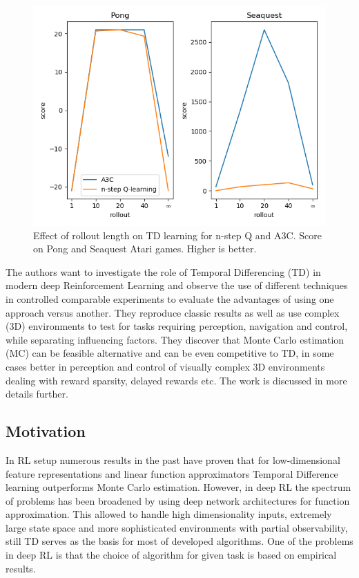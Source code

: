 \documentclass{article}
\begin{document}
\begin{figure}[H]
    \centering
    \includegraphics[scale=0.75]{results}
    \caption{Effect of rollout length on TD learning for n-step Q and A3C. Score on
    Pong and Seaquest Atari games. Higher is better.}
    \label{rollouts}
\end{figure}


\pagebreak

The authors want to investigate the role of Temporal Differencing (TD)
in modern deep Reinforcement Learning and observe the use of
different techniques in controlled comparable experiments to evaluate the
advantages of using one approach versus another.
They reproduce classic results as well as use
complex (3D) environments to test for tasks requiring perception,
navigation and control, while separating influencing factors.
They discover that Monte Carlo estimation
(MC) can be feasible alternative and can be even competitive to TD,
in some cases better
in perception and control of visually complex 3D environments
dealing with reward sparsity, delayed rewards etc.
The work is discussed in more details further.

\subsection{Motivation}
In RL setup numerous results in the past have proven
that for low-dimensional feature representations and linear function
approximators Temporal Difference learning outperforms
Monte Carlo estimation. However, in deep RL the spectrum of problems
has been broadened by using deep network architectures for function
approximation. This allowed to handle high dimensionality inputs,
extremely large state space and more sophisticated environments with partial
observability, still TD serves as the basis for
most of developed algorithms. One of the problems in deep RL is that
the choice of algorithm for given task is based on empirical results.
\end{document}
